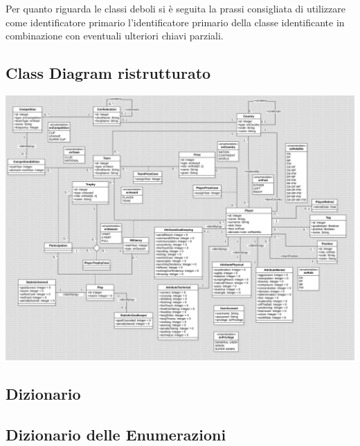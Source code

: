 Per quanto riguarda le classi deboli si è seguita la prassi consigliata di utilizzare come
identificatore primario l'identificatore primario della classe identificante in combinazione con
eventuali ulteriori chiavi parziali.

\newpage
\subsection{Class Diagram ristrutturato}
\includegraphics[width=\textwidth]{res/class_diagram_ristr}
\newpage

\subsection{Dizionario}

\subsection{Dizionario delle Enumerazioni}

